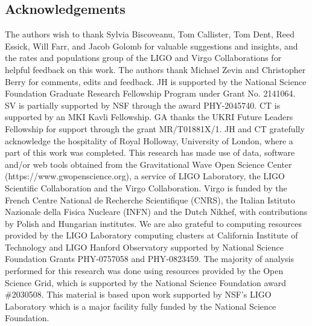 \begin{refsection}

\section{Acknowledgements}

The authors wish to thank Sylvia Biscoveanu, Tom Callister, Tom Dent, Reed Essick, Will Farr, and Jacob Golomb for valuable suggestions and insights, and the rates and populations group of the LIGO and
Virgo Collaborations for helpful feedback on this work. The authors thank Michael Zevin and Christopher Berry for comments, edits and feedback.
JH is supported by the National Science Foundation Graduate Research Fellowship Program under Grant No. 2141064. 
SV is partially supported by NSF through the award PHY-2045740.
CT is supported by an MKI Kavli Fellowship.
GA thanks the UKRI Future Leaders Fellowship for support through the grant
MR/T01881X/1. JH and CT gratefully acknowledge the hospitality of Royal Holloway, University of London, where a part of this work was completed. 
This research has made use of data,
software and/or web tools obtained from the Gravitational Wave Open Science Center (https://www.gwopenscience.org), a service of LIGO Laboratory, the
LIGO Scientific Collaboration and the Virgo Collaboration. Virgo is funded by the French Centre National
de Recherche Scientifique (CNRS), the Italian Istituto
Nazionale della Fisica Nucleare (INFN) and the Dutch
Nikhef, with contributions by Polish and Hungarian institutes. We are also grateful to computing resources
provided by the LIGO Laboratory computing clusters
at California Institute of Technology and LIGO Hanford
Observatory supported by National Science Foundation
Grants PHY-0757058 and PHY-0823459. The majority
of analysis performed for this research was done using
resources provided by the Open Science Grid,
which is supported by the National Science Foundation
award \#2030508. 
This material is based upon work supported by NSF’s LIGO Laboratory which is a major facility fully funded by the National Science Foundation.



\end{refsection}
